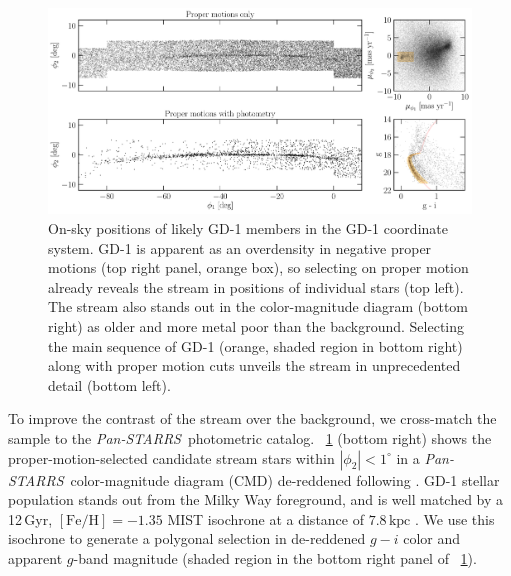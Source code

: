 \documentclass[modern]{aastex62}
\newcommand{\pans}{\textsl{Pan-STARRS}}
\newcommand{\kpc}{\textrm{kpc}}
\newcommand{\feh}{\ensuremath{[\textrm{Fe} / \textrm{H}]}}
\begin{document}
\begin{figure}
\begin{center}
\includegraphics[width=\textwidth]{gd1_sample.pdf}
\end{center}
\caption{
On-sky positions of likely GD-1 members in the GD-1 coordinate system.
GD-1 is apparent as an overdensity in negative proper motions (top right panel,
orange box), so selecting on proper motion already reveals the stream in
positions of individual stars (top left).
The stream also stands out in the color-magnitude diagram (bottom right) as
older and more metal poor than the background.
Selecting the main sequence of GD-1 (orange, shaded region in bottom right)
along with proper motion cuts unveils the stream in unprecedented detail (bottom
left).
}
\label{fig:selection}
\end{figure}

To improve the contrast of the stream over the background, we cross-match the
sample to the \pans\ photometric catalog. %
\figurename~\ref{fig:selection} (bottom right) shows the proper-motion-selected
candidate stream stars within $\left|\phi_2\right| < 1^\circ$ in a \pans\
color-magnitude diagram (CMD) de-reddened following \citet{Schlafly:2011}.
GD-1 stellar population stands out from the Milky Way foreground, and is well matched by a 12\,Gyr, $\feh = -1.35$ MIST isochrone at a distance of $7.8\,\kpc$ \citep[red line in Figure~\ref{fig:selection},][]{Dotter:2016, Choi:2016, Paxton:2011}. 
We use this isochrone to generate a polygonal selection in de-reddened $g-i$
color and apparent $g$-band magnitude (shaded region in the
bottom right panel of \figurename~\ref{fig:selection}).
\end{document}
